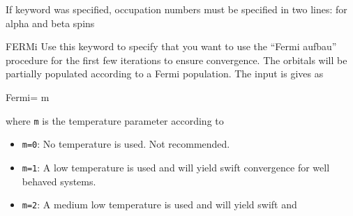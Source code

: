 \begin{keywordlist}
If  keyword was specified, occupation numbers
must be specified in two lines: for alpha and beta spins
\item[FERMi]
Use this keyword to specify that you want to use the ``Fermi aufbau''
procedure for the first few iterations to ensure convergence.
The orbitals will be partially populated according to a Fermi
population.
The input is gives as
\begin{inputlisting}
 Fermi= m
\end{inputlisting}
where \verb+m+ is the temperature parameter according to
\begin{itemize}
\item \verb+m=0+: No temperature is used. Not recommended.
\item \verb+m=1+: A low temperature is used and will yield swift convergence
           for well behaved systems.
\item \verb+m=2+: A medium low temperature is used and will yield swift and

\end{itemize}
\end{keywordlist}
